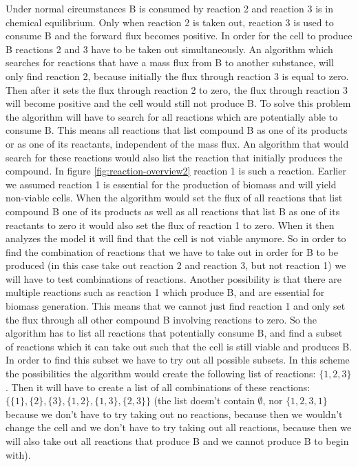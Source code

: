 \documentclass[12pt]{report}
\begin{document}
Under normal circumstances B is consumed by reaction 2 and reaction 3 is in chemical equilibrium.
Only when reaction 2 is taken out, reaction 3 is used to consume B and the forward flux becomes positive.
In order for the cell to produce B reactions 2 and 3 have to be taken out simultaneously.
An algorithm which searches for reactions that have a mass flux from B to another substance, will only find reaction 2, because initially the flux through reaction 3 is equal to zero. Then after it sets the flux through reaction 2 to zero, the flux through reaction 3 will become positive and the cell would still not produce B. 
To solve this problem the algorithm will have to search for all reactions which are potentially able to consume B. This means all reactions that list compound B as one of its products or as one of its reactants, independent of the mass flux.
An algorithm that would search for these reactions would also list the reaction that initially produces the compound. In figure \ref{fig:reaction-overview2} reaction 1 is such a reaction.
Earlier we assumed reaction 1 is essential for the production of biomass and will yield non-viable cells.
When the algorithm would set the flux of all reactions that list compound B one of its products as well as all reactions that list B as one of its reactants to zero it would also set the flux of reaction 1 to zero. When it then analyzes the model it will find that the cell is not viable anymore. So in order to find the combination of reactions that we have to take out in order for B to be produced (in this case take out reaction 2 and reaction 3, but not reaction 1) we will have to test combinations of reactions.
Another possibility is that there are multiple reactions such as reaction 1 which produce B, and are essential for biomass generation.
This means that we cannot just find reaction 1 and only set the flux through all other compound B involving reactions to zero.
So the algorithm has to list all reactions that potentially consume B, and find a subset of reactions which it can take out such that the cell is still viable and produces B.
In order to find this subset we have to try out all possible subsets. In this scheme the possibilities the algorithm would create the following list of reactions: $\{1, 2, 3\}$.
Then it will have to create a list of all combinations of these reactions: $\{\{1\},\{2\},\{3\},\{1,2\},\{1,3\},\{2,3\}\}$ (the list doesn't contain $\emptyset$, nor $\{1,2,3,1\}$ because we don't have to try taking out no reactions, because then we wouldn't change the cell and we don't have to try taking out all reactions, because then we will also take out all reactions that produce B and we cannot produce B to begin with).
\end{document}
